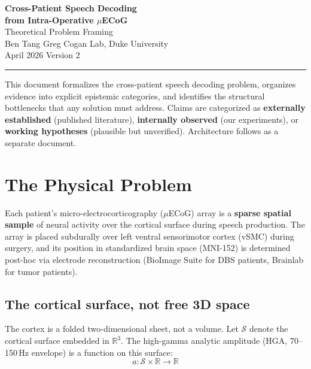\documentclass[11pt,letterpaper]{article}
\newcommand{\cS}{\mathcal{S}}
\newcommand{\R}{\mathbb{R}}
\begin{document}
\begin{center}
{\LARGE\bfseries Cross-Patient Speech Decoding\\[4pt] from Intra-Operative $\mu$ECoG}\\[12pt]
{\large Theoretical Problem Framing}\\[8pt]
{\normalsize Ben Tang \quad\textbar\quad Greg Cogan Lab, Duke University}\\[4pt]
{\normalsize April 2026 \quad\textbar\quad Version 2}
\end{center}

\medskip\noindent\rule{\textwidth}{0.4pt}\medskip

\noindent This document formalizes the cross-patient speech decoding problem, organizes evidence into explicit epistemic categories, and identifies the structural bottlenecks that any solution must address. Claims are categorized as \textbf{externally established} (published literature), \textbf{internally observed} (our experiments), or \textbf{working hypotheses} (plausible but unverified). Architecture follows as a separate document.

\section{The Physical Problem}

Each patient's micro-electrocorticography ($\mu$ECoG) array is a \textbf{sparse spatial sample} of neural activity over the cortical surface during speech production. The array is placed subdurally over left ventral sensorimotor cortex (vSMC) during surgery, and its position in standardized brain space (MNI-152) is determined post-hoc via electrode reconstruction (BioImage Suite for DBS patients, Brainlab for tumor patients).

\subsection{The cortical surface, not free 3D space}

The cortex is a folded two-dimensional sheet, not a volume. Let $\cS$ denote the cortical surface embedded in $\R^3$. The high-gamma analytic amplitude (HGA, 70--150\,Hz envelope) is a function on this surface:
\begin{equation}
a: \cS \times \R \to \R
\end{equation}
\end{document}
